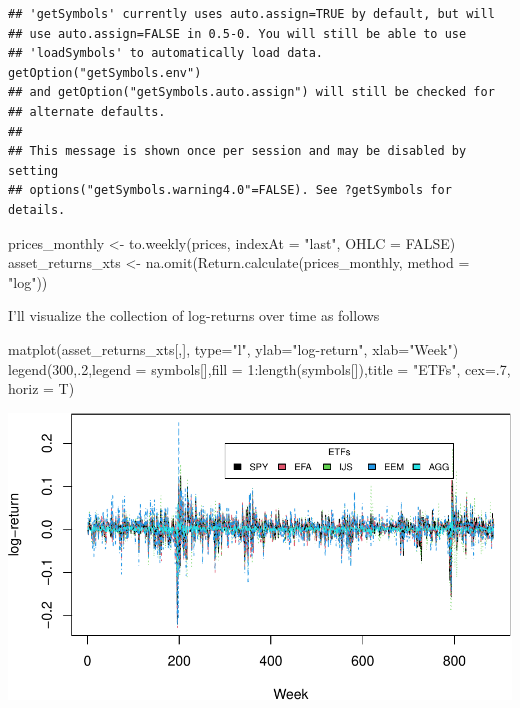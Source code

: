 \documentclass[
]{article}
\newenvironment{Shaded}{\begin{snugshade}}{\end{snugshade}}
\newcommand{\AttributeTok}[1]{\textcolor[rgb]{0.77,0.63,0.00}{#1}}
\newcommand{\ConstantTok}[1]{\textcolor[rgb]{0.00,0.00,0.00}{#1}}
\newcommand{\DecValTok}[1]{\textcolor[rgb]{0.00,0.00,0.81}{#1}}
\newcommand{\FunctionTok}[1]{\textcolor[rgb]{0.00,0.00,0.00}{#1}}
\newcommand{\NormalTok}[1]{#1}
\newcommand{\OtherTok}[1]{\textcolor[rgb]{0.56,0.35,0.01}{#1}}
\newcommand{\SpecialCharTok}[1]{\textcolor[rgb]{0.00,0.00,0.00}{#1}}
\newcommand{\StringTok}[1]{\textcolor[rgb]{0.31,0.60,0.02}{#1}}
\begin{document}
\begin{verbatim}
## 'getSymbols' currently uses auto.assign=TRUE by default, but will
## use auto.assign=FALSE in 0.5-0. You will still be able to use
## 'loadSymbols' to automatically load data. getOption("getSymbols.env")
## and getOption("getSymbols.auto.assign") will still be checked for
## alternate defaults.
## 
## This message is shown once per session and may be disabled by setting 
## options("getSymbols.warning4.0"=FALSE). See ?getSymbols for details.
\end{verbatim}

\begin{Shaded}
\begin{Highlighting}[]
\NormalTok{prices\_monthly }\OtherTok{\textless{}{-}} \FunctionTok{to.weekly}\NormalTok{(prices, }\AttributeTok{indexAt =} \StringTok{"last"}\NormalTok{, }\AttributeTok{OHLC =} \ConstantTok{FALSE}\NormalTok{)}
\NormalTok{asset\_returns\_xts }\OtherTok{\textless{}{-}} \FunctionTok{na.omit}\NormalTok{(}\FunctionTok{Return.calculate}\NormalTok{(prices\_monthly, }\AttributeTok{method =} \StringTok{"log"}\NormalTok{))}
\end{Highlighting}
\end{Shaded}

I'll visualize the collection of log-returns over time as follows

\begin{Shaded}
\begin{Highlighting}[]
\FunctionTok{matplot}\NormalTok{(asset\_returns\_xts[,], }\AttributeTok{type=}\StringTok{"l"}\NormalTok{, }\AttributeTok{ylab=}\StringTok{"log{-}return"}\NormalTok{, }\AttributeTok{xlab=}\StringTok{"Week"}\NormalTok{)}
\FunctionTok{legend}\NormalTok{(}\DecValTok{300}\NormalTok{,.}\DecValTok{2}\NormalTok{,}\AttributeTok{legend =}\NormalTok{ symbols[],}\AttributeTok{fill =} \DecValTok{1}\SpecialCharTok{:}\FunctionTok{length}\NormalTok{(symbols[]),}\AttributeTok{title =} \StringTok{"ETFs"}\NormalTok{, }\AttributeTok{cex=}\NormalTok{.}\DecValTok{7}\NormalTok{, }\AttributeTok{horiz =}\NormalTok{ T)}
\end{Highlighting}
\end{Shaded}

\begin{center}\includegraphics{portfolio_allocation_files/figure-latex/visual-1} \end{center}
\end{document}
